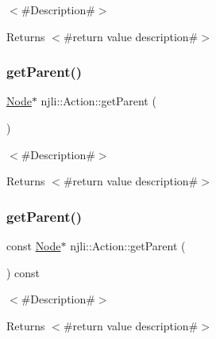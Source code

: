 $<$\#\+Description\#$>$

\begin{DoxyReturn}{Returns}
$<$\#return value description\#$>$ 
\end{DoxyReturn}
\mbox{\label{classnjli_1_1_action_a53e72e1dd95f30c07e97ad59a721669c}} 
\subsubsection{\texorpdfstring{get\+Parent()}{getParent()}\hspace{0.1cm}{\footnotesize\ttfamily [1/2]}}
{\footnotesize\ttfamily \mbox{\hyperlink{classnjli_1_1_node}{Node}}$\ast$ njli\+::\+Action\+::get\+Parent (\begin{DoxyParamCaption}{ }\end{DoxyParamCaption})}

$<$\#\+Description\#$>$

\begin{DoxyReturn}{Returns}
$<$\#return value description\#$>$ 
\end{DoxyReturn}
\mbox{\label{classnjli_1_1_action_af12f2df2adb1048d1fbe625f9be44122}} 
\subsubsection{\texorpdfstring{get\+Parent()}{getParent()}\hspace{0.1cm}{\footnotesize\ttfamily [2/2]}}
{\footnotesize\ttfamily const \mbox{\hyperlink{classnjli_1_1_node}{Node}}$\ast$ njli\+::\+Action\+::get\+Parent (\begin{DoxyParamCaption}{ }\end{DoxyParamCaption}) const}

$<$\#\+Description\#$>$

\begin{DoxyReturn}{Returns}
$<$\#return value description\#$>$ 
\end{DoxyReturn}
\mbox{\label{classnjli_1_1_action_ac4ca71716ed832be357f15f8262c8448}} 
